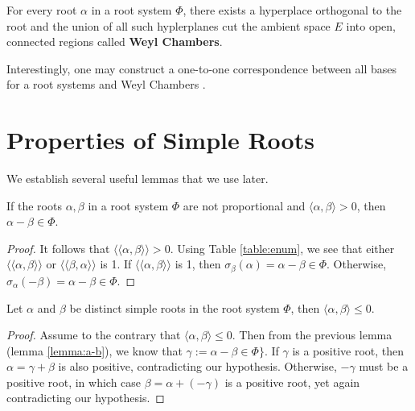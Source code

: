 For every root $\alpha$ in a root system $\Phi$, there exists a hyperplace orthogonal to the root
and the union of all such hyplerplanes cut the ambient space $E$ into open, connected regions
called \textbf{Weyl Chambers}. \newline

Interestingly, one may construct a one-to-one correspondence between all bases
for a root systems and Weyl Chambers \cite{humphreys_1972_Weyl}.

\section{Properties of Simple Roots}

We establish several useful lemmas that we use later.

\begin{lemma}
    \label{lemma:a-b}
    If the roots $\alpha, \beta$ in a root system $\Phi$ are not proportional and
    $\langle \alpha, \beta \rangle > 0$, then $\alpha - \beta \in \Phi$.
\end{lemma}

\begin{proof}
    It follows that $\langle \langle \alpha, \beta \rangle \rangle > 0$.
    Using Table \ref{table:enum}, we see that either $\langle \langle \alpha, \beta \rangle \rangle$ or 
    $\langle \langle \beta, \alpha \rangle \rangle$ is 1.
    If $\langle \langle \alpha, \beta \rangle \rangle$ is 1,
    then $\sigma_{\beta}(\alpha) = \alpha - \beta \in \Phi$.
    Otherwise, $\sigma_{\alpha}(-\beta) = \alpha - \beta \in \Phi$.
\end{proof}

\begin{lemma}
    \label{lemma:a.b_leq_0}
    Let $\alpha$ and $\beta$ be distinct simple roots in the root system $\Phi$,
    then $\langle \alpha, \beta \rangle \leq 0$.
\end{lemma}

\begin{proof}
    Assume to the contrary that $\langle \alpha, \beta \rangle \leq 0$.
    Then from the previous lemma (lemma \ref{lemma:a-b}),
    we know that $\gamma := \alpha - \beta \in \Phi\}$.
    If $\gamma$ is a positive root, then $\alpha = \gamma + \beta$ is also positive,
    contradicting our hypothesis. Otherwise, $-\gamma$ must be a positive root, in which case
    $\beta = \alpha + (-\gamma)$ is a positive root, yet again contradicting our hypothesis.
\end{proof}


